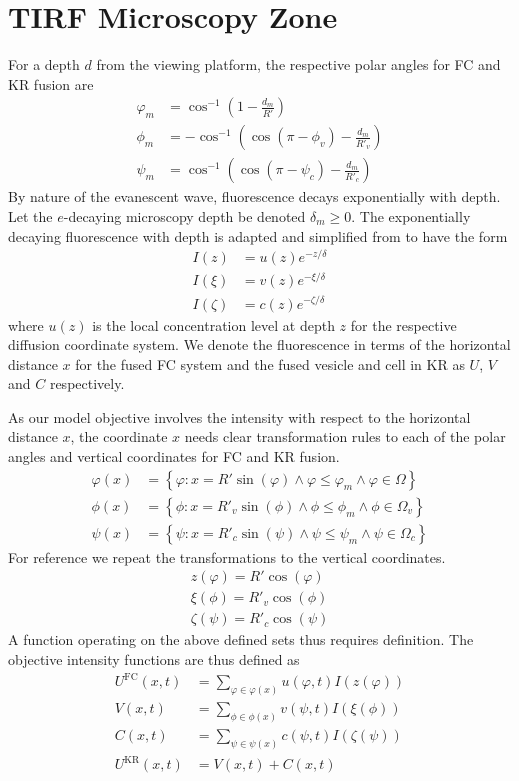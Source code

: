 \documentclass{report}
\newcommand\Par[1]{{ \left({#1}\right) }}
\newcommand\Brace[1]{{ \left\{{#1}\right\} }}
\newcommand\R{{ R' }}
\newcommand\Rc{{ R'_c }}
\newcommand\Rv{{ R'_v }}
\newcommand\FC{{ \text{FC} }}
\newcommand\KR{{ \text{KR} }}
\newcommand{\ze}{{ \zeta }}
\begin{document}
\section{TIRF Microscopy Zone}
For a depth $d$ from the viewing platform, the respective polar angles for FC and KR fusion are
\begin{align*}
	\varphi_m &= \cos^{-1}\Par{1 - \frac{d_m}{\R}} \\
	\phi_m &= -\cos^{-1}\Par{\cos\Par{\pi - \phi_v} - \frac{d_m}{\Rv}} \\
	\psi_m &= \cos^{-1}\Par{\cos(\pi - \psi_c) - \frac{d_m}{\Rc}}
\end{align*}
By nature of the evanescent wave, fluorescence decays exponentially with depth. Let the $e$-decaying microscopy depth be denoted $\delta_m \geq 0$. The exponentially decaying fluorescence with depth is adapted and simplified from \cite{oheim2019calibrating} to have the form
\begin{align*}
	I(z) &= u(z) e^{-z/\delta} \\
	I(\xi) &= v(z) e^{-\xi/\delta} \\
	I(\ze) &= c(z) e^{-\ze/\delta}
\end{align*}
where $u(z)$ is the local concentration level at depth $z$ for the respective diffusion coordinate system. We denote the fluorescence in terms of the horizontal distance $x$ for the fused FC system and the fused vesicle and cell in KR as $U$, $V$ and $C$ respectively.

As our model objective involves the intensity with respect to the horizontal distance $x$, the coordinate $x$ needs clear transformation rules to each of the polar angles and vertical coordinates for FC and KR fusion.
\begin{align*}
	\varphi(x) &= \Brace{
		\varphi
		: x = \R \sin(\varphi)
		\land \varphi \leq \varphi_m
		\land \varphi \in \Omega
	} \\
	\phi(x) &= \Brace{
		\phi
		: x = \Rv \sin(\phi)
		\land \phi \leq \phi_m
		\land \phi \in \Omega_v
	} \\
	\psi(x) &= \Brace{
		\psi
		: x = \Rc \sin(\psi)
		\land \psi \leq \psi_m
		\land \psi \in \Omega_c
	}
\end{align*}
For reference we repeat the transformations to the vertical coordinates.
\begin{align*}
	z(\varphi) = \R \cos(\varphi) \\
	\xi(\phi) = \Rv \cos(\phi) \\
	\ze(\psi) = \Rc \cos(\psi)
\end{align*}
A function operating on the above defined sets thus requires definition. The objective intensity functions are thus defined as
\begin{align*}
	U^\FC(x, t) &= \sum_{\varphi \in \varphi(x)} u(\varphi, t) I(z(\varphi)) \\
	V(x, t) &= \sum_{\phi \in \phi(x)} v(\psi, t) I(\xi(\phi)) \\
	C(x, t) &= \sum_{\psi \in \psi(x)} c(\psi, t) I(\ze(\psi)) \\
	U^\KR(x, t) &= V(x, t) + C(x, t)
\end{align*}
\end{document}
